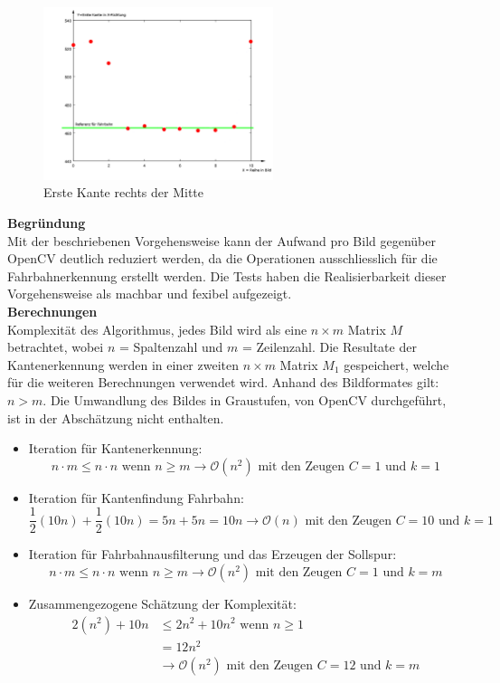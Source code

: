 \begin{figure}[H]
\centering
\includegraphics[width=0.6\textwidth]{03_Loesungskonzept/pictures/maxEdge.png}
\caption{Erste Kante rechts der Mitte}
\label{fig:kantenr}
\end{figure}\flushleft
\textbf{Begründung}\\[0.2cm]
Mit der beschriebenen Vorgehensweise kann der Aufwand pro Bild gegenüber OpenCV deutlich reduziert werden, da die Operationen ausschliesslich für die Fahrbahnerkennung erstellt werden. Die Tests haben die Realisierbarkeit dieser Vorgehensweise als machbar und fexibel aufgezeigt.\\[0.2cm]
\textbf{Berechnungen}\\[0.2cm]
Komplexität des Algorithmus, jedes Bild wird als eine $n\times{m}$ Matrix $M$ betrachtet, wobei $n$ = Spaltenzahl und $m$ = Zeilenzahl. Die Resultate der Kantenerkennung werden in einer zweiten $n\times{m}$ Matrix $M_1$ gespeichert, welche für die weiteren Berechnungen verwendet wird. Anhand des Bildformates gilt: $n>m$. Die Umwandlung des Bildes in Graustufen, von OpenCV durchgeführt, ist in der Abschätzung nicht enthalten.
\begin{itemize}
\item Iteration für Kantenerkennung:
\[
n \cdot m \leq n \cdot n \text{ wenn } n\geq m \rightarrow \mathcal{O}(n^2) \text{ mit den Zeugen }C=1 \text{ und } k = 1
\]
\item Iteration für Kantenfindung Fahrbahn:
\[
\frac{1}{2}(10n) + \frac{1}{2}(10n) = 5n + 5n = 10n \rightarrow \mathcal{O}(n) \text{ mit den Zeugen }C=10 \text{ und } k = 1
\]
\item Iteration für Fahrbahnausfilterung und das Erzeugen der Sollspur:
\[
n \cdot m \leq n \cdot n \text{ wenn } n\geq m \rightarrow \mathcal{O}(n^2) \text{ mit den Zeugen }C=1 \text{ und } k = m
\]
\item Zusammengezogene Schätzung der Komplexität:
\begin{align*}
2(n^2) + 10n &\leq 2n^2 + 10n^2 \text{ wenn } n\geq 1\\
             &= 12n^2\\
             &\rightarrow \mathcal{O}(n^2) \text{ mit den Zeugen }C=12 \text{ und } k = m
\end{align*}
\end{itemize}
